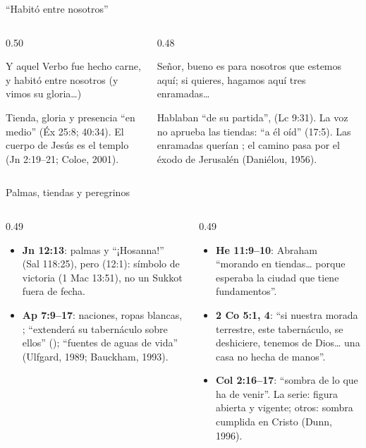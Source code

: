 \begin{frame}{``Habitó entre nosotros''}
\begin{columns}[t,onlytextwidth]
\begin{column}{0.50\textwidth}
\centering{}
\begin{cita}Y aquel Verbo fue hecho carne, y habitó entre nosotros (y vimos su gloria\ldots)\end{cita}
\scriptsize Tienda, gloria y presencia ``en medio'' (Éx 25:8; 40:34). El cuerpo de Jesús es el templo (Jn 2:19--21; Coloe, 2001).\par\smallskip
{}
\end{column}
\begin{column}{0.48\textwidth}
\begin{cita}Señor, bueno es para nosotros que estemos aquí; si quieres, hagamos aquí tres enramadas\ldots{}\end{cita}
\scriptsize Hablaban ``de su partida'',  (Lc 9:31). La voz no aprueba las tiendas: ``a él oíd'' (17:5). Las enramadas querían ; el camino pasa por el éxodo de Jerusalén (Daniélou, 1956).
\end{column}
\end{columns}
\end{frame}

\begin{frame}{Palmas, tiendas y peregrinos}
\begin{columns}[t,onlytextwidth]
\begin{column}{0.49\textwidth}\scriptsize
\begin{itemize}
\item \textbf{Jn 12:13}: palmas y ``¡Hosanna!'' (Sal 118:25), pero  (12:1): símbolo de victoria (1 Mac 13:51), no un Sukkot fuera de fecha.
\item \textbf{Ap 7:9--17}: naciones, ropas blancas, ; ``extenderá su tabernáculo sobre ellos'' (); ``fuentes de aguas de vida'' (Ulfgard, 1989; Bauckham, 1993).
\end{itemize}
\end{column}
\begin{column}{0.49\textwidth}\scriptsize
\begin{itemize}
\item \textbf{He 11:9--10}: Abraham ``morando en tiendas\ldots{} porque esperaba la ciudad que tiene fundamentos''.
\item \textbf{2 Co 5:1, 4}: ``si nuestra morada terrestre, este tabernáculo, se deshiciere, tenemos de Dios\ldots{} una casa no hecha de manos''.
\item \textbf{Col 2:16--17}: ``sombra de lo que ha de venir''. La serie: figura abierta y vigente; otros: sombra cumplida en Cristo (Dunn, 1996).
\end{itemize}
\end{column}
\end{columns}
\end{frame}

